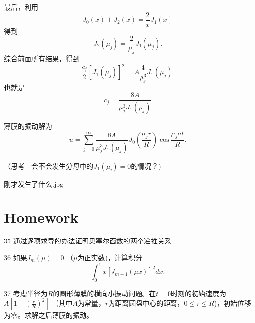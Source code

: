 \documentclass[CJK]{beamer}
\begin{document}
\begin{frame}
  \bch
  最后，利用
  $$J_0(x)+J_2(x) = \frac{2}{x}J_1(x)$$
  得到
  $$J_2(\mu_j) = \frac{2}{\mu_j}J_1(\mu_j).$$
  综合前面所有结果，得到
  $$ \frac{c_j}{2} \left[J_1\left(\mu_j\right)\right]^2 =  A\frac{4}{\mu_j^3}J_1(\mu_j). $$
  也就是
  $$ c_j = \frac{8A}{\mu_j^3J_1(\mu_j)} $$
  \ech
\end{frame}


\begin{frame}
  \bch
  薄膜的振动解为
  $$ u = \sum_{j=0}^\infty \frac{8A}{\mu_j^3J_1(\mu_j)}J_0\left( \frac{\mu_jr}{R}\right)\cos\frac{\mu_jat}{R}. $$

  \skiplines

  （思考：会不会发生分母中的$J_1(\mu_i)=0$的情况？)
  \ech
\end{frame}


\begin{frame}
  \bch
  \bcenter

  刚才发生了什么.jpg
  \ecenter
  \ech
\end{frame}


\section{Homework}

\begin{frame}
  \bch
  \bitem
\item[35]{通过逐项求导的办法证明贝塞尔函数的两个递推关系}
\item[36]{如果$J_m(\mu) = 0$ （$\mu$为正实数)，计算积分
    $$\int_0^1x\left[J_{m+1}(\mu x)\right]^2 dx. $$
}
\item[37]{ 考虑半径为$R$的圆形薄膜的横向小振动问题。在$t=0$时刻的初始速度为$A\left[1-\left(\frac{r}{R}\right)^2\right]$ （其中$A$为常量，$r$为距离圆盘中心的距离，$0\le r\le R$)，初始位移为零。求解之后薄膜的振动。
 }
  \eitem
  \ech
\end{frame}
\end{document}
